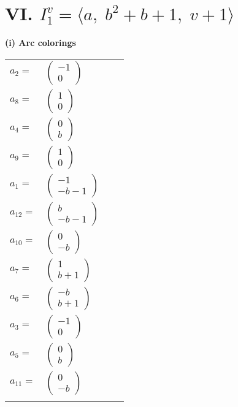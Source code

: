 \documentclass[1p]{elsarticle_modified}
\theoremstyle{definition}
\begin{document}
\centering \section*{VI. $I^v_{1}= \langle a,\;b^2+b+1,\;v+1 \rangle$}
\flushleft \textbf{(i) Arc colorings}\\
\begin{tabular}{m{7pt} m{180pt} m{7pt} m{180pt} }
\flushright $a_{2}=$&$\begin{pmatrix}-1\\0\end{pmatrix}$ \\
\flushright $a_{8}=$&$\begin{pmatrix}1\\0\end{pmatrix}$ \\
\flushright $a_{4}=$&$\begin{pmatrix}0\\b\end{pmatrix}$ \\
\flushright $a_{9}=$&$\begin{pmatrix}1\\0\end{pmatrix}$ \\
\flushright $a_{1}=$&$\begin{pmatrix}-1\\- b-1\end{pmatrix}$ \\
\flushright $a_{12}=$&$\begin{pmatrix}b\\- b-1\end{pmatrix}$ \\
\flushright $a_{10}=$&$\begin{pmatrix}0\\- b\end{pmatrix}$ \\
\flushright $a_{7}=$&$\begin{pmatrix}1\\b+1\end{pmatrix}$ \\
\flushright $a_{6}=$&$\begin{pmatrix}- b\\b+1\end{pmatrix}$ \\
\flushright $a_{3}=$&$\begin{pmatrix}-1\\0\end{pmatrix}$ \\
\flushright $a_{5}=$&$\begin{pmatrix}0\\b\end{pmatrix}$ \\
\flushright $a_{11}=$&$\begin{pmatrix}0\\- b\end{pmatrix}$\\&\end{tabular}
\end{document}
